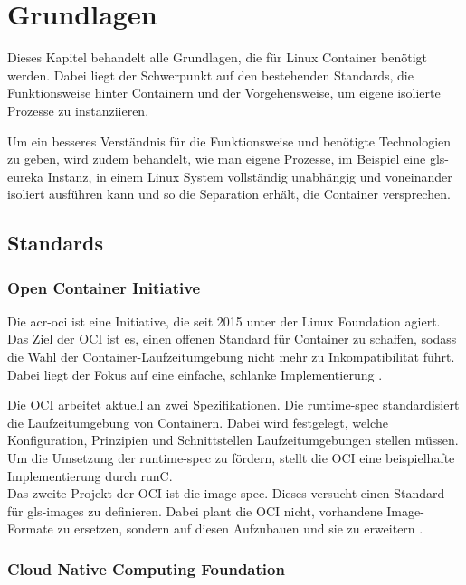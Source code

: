 \chapter{Grundlagen}
\label{chap:grundlagen}
Dieses Kapitel behandelt alle Grundlagen, die für Linux Container benötigt werden. Dabei liegt der Schwerpunkt auf den bestehenden Standards, die Funktionsweise hinter Containern und der Vorgehensweise, um eigene isolierte Prozesse zu instanziieren.

Um ein besseres Verständnis für die Funktionsweise und benötigte Technologien zu geben, wird zudem behandelt, wie man eigene Prozesse, im Beispiel eine \gls{gls-eureka} Instanz, in einem Linux System vollständig unabhängig und voneinander isoliert ausführen kann und so die Separation erhält, die Container versprechen.

\section{Standards}
\label{sec:standards}

\subsection{Open Container Initiative}
\label{sec:oci}
Die \gls{acr-oci} ist eine Initiative, die seit 2015 unter der Linux Foundation agiert. Das Ziel der OCI ist es, einen offenen Standard für Container zu schaffen, sodass die Wahl der Container-Laufzeitumgebung nicht mehr zu Inkompatibilität führt. Dabei liegt der Fokus auf eine einfache, schlanke Implementierung \citep{OpenContainerInitiative}.

Die OCI arbeitet aktuell an zwei Spezifikationen. Die runtime-spec standardisiert die Laufzeitumgebung  von Containern. Dabei wird festgelegt, welche Konfiguration, Prinzipien und Schnittstellen Laufzeitumgebungen stellen müssen. Um die Umsetzung der runtime-spec zu fördern, stellt die OCI eine beispielhafte Implementierung durch runC. \\

Das zweite Projekt der OCI ist die image-spec. Dieses versucht einen Standard für \glspl{gls-image} zu definieren. Dabei plant die OCI nicht, vorhandene Image-Formate zu ersetzen, sondern auf diesen Aufzubauen und sie zu erweitern \citep{OpenContainerInitiative}.

\subsection{Cloud Native Computing Foundation}
\label{sec:cncf}

